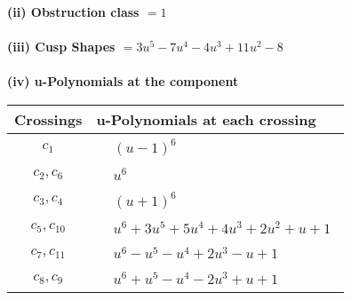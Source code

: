 \documentclass[1p]{elsarticle_modified}
\theoremstyle{definition}
\begin{document}
\flushleft \textbf{(ii) Obstruction class $= 1$}\\~\\
\flushleft \textbf{(iii) Cusp Shapes $= 3 u^5-7 u^4-4 u^3+11 u^2-8$}\\~\\
\newpage\renewcommand{\arraystretch}{1}
\flushleft \textbf{(iv) u-Polynomials at the component}\newline \\
\begin{tabular}{m{50pt}|m{274pt}}
Crossings & \hspace{64pt}u-Polynomials at each crossing \\
\hline $$\begin{aligned}c_{1}\end{aligned}$$&$\begin{aligned}
&(u-1)^6
\end{aligned}$\\
\hline $$\begin{aligned}c_{2},c_{6}\end{aligned}$$&$\begin{aligned}
&u^6
\end{aligned}$\\
\hline $$\begin{aligned}c_{3},c_{4}\end{aligned}$$&$\begin{aligned}
&(u+1)^6
\end{aligned}$\\
\hline $$\begin{aligned}c_{5},c_{10}\end{aligned}$$&$\begin{aligned}
&u^6+3 u^5+5 u^4+4 u^3+2 u^2+u+1
\end{aligned}$\\
\hline $$\begin{aligned}c_{7},c_{11}\end{aligned}$$&$\begin{aligned}
&u^6- u^5- u^4+2 u^3- u+1
\end{aligned}$\\
\hline $$\begin{aligned}c_{8},c_{9}\end{aligned}$$&$\begin{aligned}
&u^6+u^5- u^4-2 u^3+u+1
\end{aligned}$\\
\hline
\end{tabular}\\~\\
\end{document}
